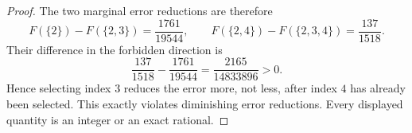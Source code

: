 \begin{cxrefutation}
\begin{proof}
The two marginal error reductions are therefore
\[
 F(\{2\})-F(\{2,3\})=\frac{1761}{19544},\qquad
 F(\{2,4\})-F(\{2,3,4\})=\frac{137}{1518}.
\]
Their difference in the forbidden direction is
\[
 \frac{137}{1518}-\frac{1761}{19544}
 =\frac{2165}{14833896}>0.
\]
Hence selecting index $3$ reduces the error more, not less, after index $4$
has already been selected.  This exactly violates diminishing error
reductions.  Every displayed quantity is an integer or an exact rational.
\end{proof}
\end{cxrefutation}
